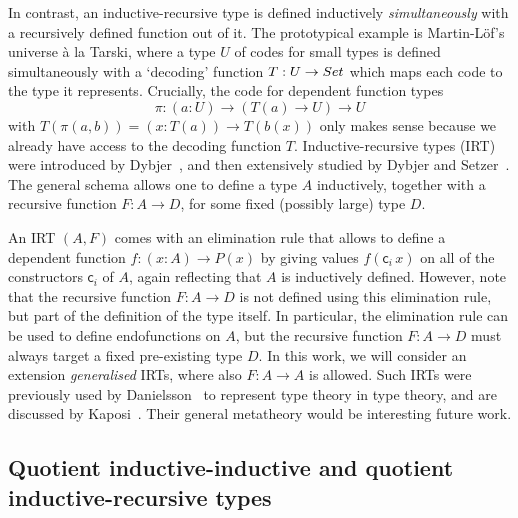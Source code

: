 \documentclass[a4paper,UKenglish,numberwithinsect,cleveref,thm-restate]{lipics-v2021}
\newcommand{\LT}[2][]{\todo[inline,author={L-T},caption={},color={pink},#1]{#2}}
\begin{document}
In contrast, an inductive-recursive type is defined inductively \emph{simultaneously} with a recursively defined function out of it. The prototypical example is Martin-L\"of's universe \`a la Tarski, where a type $U$ of codes for small types is defined simultaneously with a `decoding' function $T : U \to \Set$ which maps each code to the type it represents. Crucially, the code for dependent function types
\[
  \pi : (a : U) \to (T(a) \to U) \to U
\]
with $T(\pi(a, b)) = (x : T(a)) \to T(b(x))$ only makes sense because we already have access to the decoding function $T$.
%
Inductive-recursive types (IRT) were introduced by Dybjer~\cite{Dybjer2000}, and then extensively studied by Dybjer and Setzer~\cite{Dybjer1999,Dybjer2003}.
The general schema allows one to define a type $A$ inductively, together with a recursive function $F : A \to D$, for some fixed (possibly large) type $D$.

An IRT $(A, F)$ comes with an elimination rule that allows to define a dependent function  $f : (x : A) \to P(x)$ by giving values $f(\mathsf{c}_i\,x)$ on all of the constructors $\mathsf{c}_i$ of $A$, again reflecting that $A$ is inductively defined.
%
However, note that the recursive function $F : A \to D$ is not defined using this elimination rule, but part of the definition of the type itself.
%
In particular, the elimination rule can be used to define endofunctions on $A$, but the recursive function  $F : A \to D$ must always target a fixed pre-existing type $D$.
%
In this work, we will consider an extension \emph{generalised} IRTs, where also $F : A \to A$ is allowed.
%
Such IRTs were previously used by Danielsson~\cite{Danielsson2006} to represent type theory in type theory, and are discussed by Kaposi~\cite{Kaposi2023}.
%
Their general metatheory would be interesting future work.



\subsection{Quotient inductive-inductive and quotient inductive-recursive types}
\end{document}
